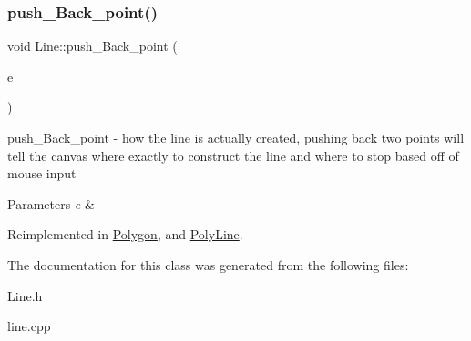 \subsubsection{\texorpdfstring{push\+\_\+\+Back\+\_\+point()}{push\_Back\_point()}}
{\footnotesize\ttfamily void Line\+::push\+\_\+\+Back\+\_\+point (\begin{DoxyParamCaption}\item[{Q\+Point}]{e }\end{DoxyParamCaption})\hspace{0.3cm}{\ttfamily [virtual]}}



push\+\_\+\+Back\+\_\+point -\/ how the line is actually created, pushing back two points will tell the canvas where exactly to construct the line and where to stop based off of mouse input 


\begin{DoxyParams}{Parameters}
{\em e} & \\
\hline
\end{DoxyParams}


Reimplemented in \hyperlink{class_polygon_ad57f4b375c6858bfe34c095bfeb38d5a}{Polygon}, and \hyperlink{class_poly_line_afbc3a0e59abcd27bdb58027796e91c3a}{Poly\+Line}.



The documentation for this class was generated from the following files\+:\begin{DoxyCompactItemize}
\item 
Line.\+h\item 
line.\+cpp\end{DoxyCompactItemize}
